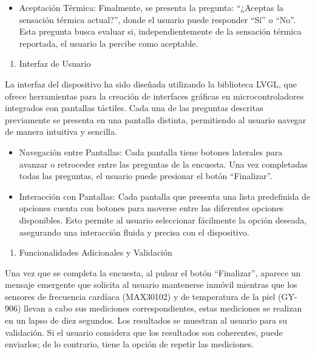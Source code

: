 \documentclass[
  letterpaper,
  DIV=11,
  numbers=noendperiod]{scrreport}
\providecommand{\tightlist}{%
  \setlength{\itemsep}{0pt}\setlength{\parskip}{0pt}}\usepackage{longtable,booktabs,array}
\begin{document}
\begin{itemize}
\tightlist
\item
  Aceptación Térmica: Finalmente, se presenta la pregunta: ``¿Aceptas la
  sensación térmica actual?'', donde el usuario puede responder ``Sí'' o
  ``No''. Esta pregunta busca evaluar si, independientemente de la
  sensación térmica reportada, el usuario la percibe como aceptable.
\end{itemize}

\begin{enumerate}
\def\labelenumi{\arabic{enumi}.}
\setcounter{enumi}{1}
\tightlist
\item
  Interfaz de Usuario
\end{enumerate}

La interfaz del dispositivo ha sido diseñada utilizando la biblioteca
LVGL, que ofrece herramientas para la creación de interfaces gráficas en
microcontroladores integrados con pantallas táctiles. Cada una de las
preguntas descritas previamente se presenta en una pantalla distinta,
permitiendo al usuario navegar de manera intuitiva y sencilla.

\begin{itemize}
\item
  Navegación entre Pantallas: Cada pantalla tiene botones laterales para
  avanzar o retroceder entre las preguntas de la encuesta. Una vez
  completadas todas las preguntas, el usuario puede presionar el botón
  ``Finalizar''.
\item
  Interacción con Pantallas: Cada pantalla que presenta una lista
  predefinida de opciones cuenta con botones para moverse entre las
  diferentes opciones disponibles. Esto permite al usuario seleccionar
  fácilmente la opción deseada, asegurando una interacción fluida y
  precisa con el dispositivo.
\end{itemize}

\begin{enumerate}
\def\labelenumi{\arabic{enumi}.}
\setcounter{enumi}{2}
\tightlist
\item
  Funcionalidades Adicionales y Validación
\end{enumerate}

Una vez que se completa la encuesta, al pulsar el botón ``Finalizar'',
aparece un mensaje emergente que solicita al usuario mantenerse inmóvil
mientras que los sensores de frecuencia cardíaca (MAX30102) y de
temperatura de la piel (GY-906) llevan a cabo sus mediciones
correspondientes, estas mediciones se realizan en un lapso de diez
segundos. Los resultados se muestran al usuario para su validación. Si
el usuario considera que los resultados son coherentes, puede enviarlos;
de lo contrario, tiene la opción de repetir las mediciones.
\end{document}
